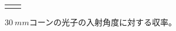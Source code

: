 \begin{figure}[htbp]
\begin{tabular}{cc}
\begin{minipage}[t]{0.45\hsize}
      \caption{$\SI{30}{mm}$コーンの光子の入射角度に対する収率。}
      \label{fig:cone30_optimize2}
    \end{minipage}
  \end{tabular}
\end{figure}